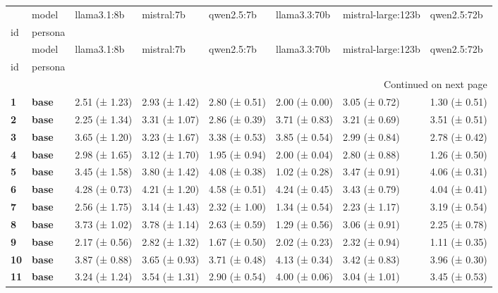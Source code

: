 \begin{longtable}{llllllll}
\toprule
 & model & llama3.1:8b & mistral:7b & qwen2.5:7b & llama3.3:70b & mistral-large:123b & qwen2.5:72b \\
id & persona &  &  &  &  &  &  \\
\midrule
\endfirsthead
\toprule
 & model & llama3.1:8b & mistral:7b & qwen2.5:7b & llama3.3:70b & mistral-large:123b & qwen2.5:72b \\
id & persona &  &  &  &  &  &  \\
\midrule
\endhead
\midrule
\multicolumn{8}{r}{Continued on next page} \\
\midrule
\endfoot
\bottomrule
\endlastfoot
\textbf{1} & \textbf{base} & 2.51 (± 1.23) & 2.93 (± 1.42) & 2.80 (± 0.51) & 2.00 (± 0.00) & 3.05 (± 0.72) & 1.30 (± 0.51) \\
\cline{1-8}
\textbf{2} & \textbf{base} & 2.25 (± 1.34) & 3.31 (± 1.07) & 2.86 (± 0.39) & 3.71 (± 0.83) & 3.21 (± 0.69) & 3.51 (± 0.51) \\
\cline{1-8}
\textbf{3} & \textbf{base} & 3.65 (± 1.20) & 3.23 (± 1.67) & 3.38 (± 0.53) & 3.85 (± 0.54) & 2.99 (± 0.84) & 2.78 (± 0.42) \\
\cline{1-8}
\textbf{4} & \textbf{base} & 2.98 (± 1.65) & 3.12 (± 1.70) & 1.95 (± 0.94) & 2.00 (± 0.04) & 2.80 (± 0.88) & 1.26 (± 0.50) \\
\cline{1-8}
\textbf{5} & \textbf{base} & 3.45 (± 1.58) & 3.80 (± 1.42) & 4.08 (± 0.38) & 1.02 (± 0.28) & 3.47 (± 0.91) & 4.06 (± 0.31) \\
\cline{1-8}
\textbf{6} & \textbf{base} & 4.28 (± 0.73) & 4.21 (± 1.20) & 4.58 (± 0.51) & 4.24 (± 0.45) & 3.43 (± 0.79) & 4.04 (± 0.41) \\
\cline{1-8}
\textbf{7} & \textbf{base} & 2.56 (± 1.75) & 3.14 (± 1.43) & 2.32 (± 1.00) & 1.34 (± 0.54) & 2.23 (± 1.17) & 3.19 (± 0.54) \\
\cline{1-8}
\textbf{8} & \textbf{base} & 3.73 (± 1.02) & 3.78 (± 1.14) & 2.63 (± 0.59) & 1.29 (± 0.56) & 3.06 (± 0.91) & 2.25 (± 0.78) \\
\cline{1-8}
\textbf{9} & \textbf{base} & 2.17 (± 0.56) & 2.82 (± 1.32) & 1.67 (± 0.50) & 2.02 (± 0.23) & 2.32 (± 0.94) & 1.11 (± 0.35) \\
\cline{1-8}
\textbf{10} & \textbf{base} & 3.87 (± 0.88) & 3.65 (± 0.93) & 3.71 (± 0.48) & 4.13 (± 0.34) & 3.42 (± 0.83) & 3.96 (± 0.30) \\
\cline{1-8}
\textbf{11} & \textbf{base} & 3.24 (± 1.24) & 3.54 (± 1.31) & 2.90 (± 0.54) & 4.00 (± 0.06) & 3.04 (± 1.01) & 3.45 (± 0.53) \\

\end{longtable}
